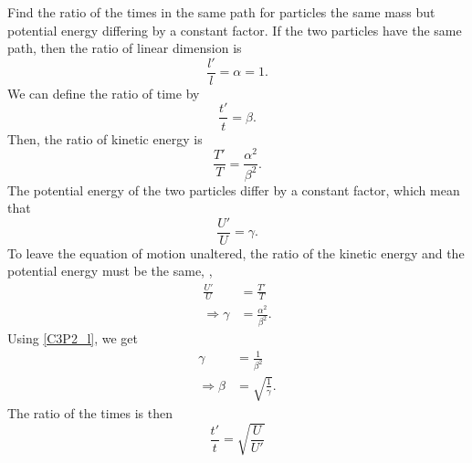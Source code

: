 \begin{problem}
{
Find the ratio of the times in the same path for particles the same mass but potential energy differing by a constant factor.
}
{
If the two particles have the same path, then the ratio of linear dimension is
\begin{equation} \label{C3P2_l}
    \frac{l'}{l} = \alpha = 1.
\end{equation}
We can define the ratio of time by
\begin{equation*}
    \frac{t'}{t} = \beta .
\end{equation*}
Then, the ratio of kinetic energy is 
\begin{equation*}
    \frac{T'}{T} = \frac{\alpha^2}{\beta^2}.
\end{equation*}
The potential energy of the two particles differ by a constant factor, which mean that
\begin{equation*}
    \frac{U'}{U} = \gamma .
\end{equation*}
To leave the equation of motion unaltered, the ratio of the kinetic energy and the potential energy must be the same, \ie,
\begin{align*}
    \frac{U'}{U} &= \frac{T'}{T} \\
    \Rightarrow \gamma &=  \frac{\alpha^2}{\beta^2}.
\end{align*}
Using \eqref{C3P2_l}, we get
\begin{align*}
    \gamma &= \frac{1}{\beta^2} \\
    \Rightarrow \beta &= \sqrt{\frac{1}{\gamma}}.
\end{align*}
The ratio of the times is then
}
{
\begin{equation*}
    \frac{t'}{t} = \sqrt{\frac{U}{U'}}
\end{equation*}
}
\end{problem}